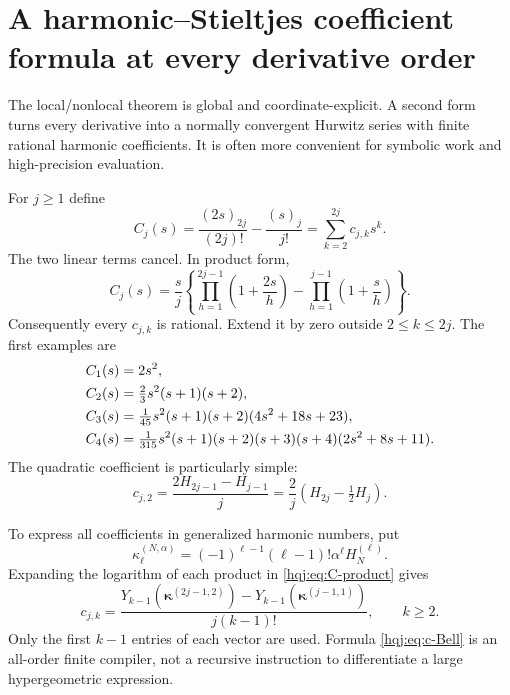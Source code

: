 \section{A harmonic--Stieltjes coefficient formula at every derivative order}
\label{hqj:sec:harmonic}

The local/nonlocal theorem is global and coordinate-explicit. A second
form turns every derivative into a normally convergent Hurwitz series
with finite rational harmonic coefficients. It is often more convenient
for symbolic work and high-precision evaluation.

For $j\ge1$ define
\begin{equation}\label{hqj:eq:Cj}
C_j(s)=\frac{(2s)_{2j}}{(2j)!}-\frac{(s)_j}{j!}
=\sum_{k=2}^{2j}c_{j,k}s^k.
\end{equation}
The two linear terms cancel. In product form,
\begin{equation}\label{hqj:eq:C-product}
C_j(s)=\frac{s}{j}\left\{
\prod_{h=1}^{2j-1}\left(1+\frac{2s}{h}\right)
-\prod_{h=1}^{j-1}\left(1+\frac{s}{h}\right)\right\}.
\end{equation}
Consequently every $c_{j,k}$ is rational. Extend it by zero outside
$2\le k\le2j$. The first examples are
\begin{align}
C_1(s)&=2s^2,\notag\\
C_2(s)&=\tfrac23s^2(s+1)(s+2),\notag\\
C_3(s)&=\tfrac1{45}s^2(s+1)(s+2)(4s^2+18s+23),\label{hqj:eq:C-examples}\\
C_4(s)&=\tfrac1{315}s^2(s+1)(s+2)(s+3)(s+4)(2s^2+8s+11).\notag
\end{align}
The quadratic coefficient is particularly simple:
\begin{equation}\label{hqj:eq:c2}
c_{j,2}=\frac{2H_{2j-1}-H_{j-1}}j
=\frac2j\left(H_{2j}-\tfrac12H_j\right).
\end{equation}

To express all coefficients in generalized harmonic numbers, put
\[
\kappa_\ell^{(N,\alpha)}
=(-1)^{\ell-1}(\ell-1)!\alpha^\ell H_N^{(\ell)}.
\]
Expanding the logarithm of each product in \eqref{hqj:eq:C-product} gives
\begin{equation}\label{hqj:eq:c-Bell}
c_{j,k}=\frac{
Y_{k-1}(\bm\kappa^{(2j-1,2)})-
Y_{k-1}(\bm\kappa^{(j-1,1)})}{j(k-1)!},\qquad k\ge2.
\end{equation}
Only the first $k-1$ entries of each vector are used. Formula
\eqref{hqj:eq:c-Bell} is an all-order finite compiler, not a recursive
instruction to differentiate a large hypergeometric expression.

